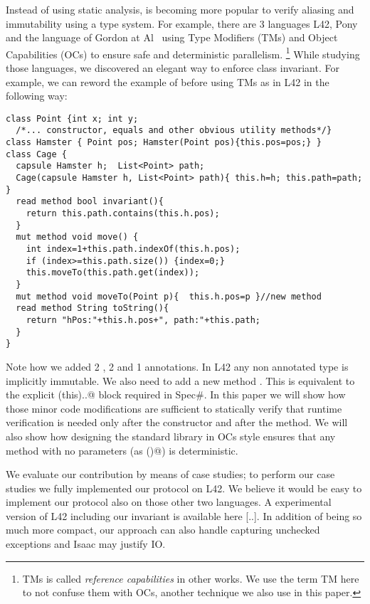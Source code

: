Instead of using static analysis, 
is becoming more popular to verify aliasing and immutability using a type system.
For example, there are 3 languages L42, Pony and the language of Gordon at Al~\cite{}
using Type Modifiers (TMs) and Object Capabilities (OCs) to ensure safe and deterministic parallelism.%
\footnote{TMs is called \emph{reference capabilities} in other works. We use the term TM here
to not confuse them with OCs, another technique we also use in this paper.}
While studying those languages, we discovered an elegant way to enforce class invariant.
For example, we can reword the example of before using TMs as in L42 in the following way:
\begin{lstlisting}
class Point {int x; int y;
  /*... constructor, equals and other obvious utility methods*/}
class Hamster { Point pos; Hamster(Point pos){this.pos=pos;} }
class Cage {
  capsule Hamster h;  List<Point> path;
  Cage(capsule Hamster h, List<Point> path){ this.h=h; this.path=path; }
  read method bool invariant(){
    return this.path.contains(this.h.pos);
  }
  mut method void move() {
    int index=1+this.path.indexOf(this.h.pos);
    if (index>=this.path.size()) {index=0;}
    this.moveTo(this.path.get(index));
  }
  mut method void moveTo(Point p){  this.h.pos=p }//new method
  read method String toString(){
    return "hPos:"+this.h.pos+", path:"+this.path;
  }
}
\end{lstlisting}
Note how we added 2 \Q@read@, 2 \Q@mut@ and 1 \Q@capsule@ annotations.
In L42 any non annotated type is implicitly immutable.
We also need to add a new method \Q@moveTo@. This is equivalent to the explicit \Q@expose(this){..}@
block required in Spec\#.
In this paper we will show how those minor code modifications are sufficient
to statically verify that runtime verification is needed only
after the constructor and after the \Q@moveTo@ method.
We will also show how designing the standard library in OCs style
ensures that any \Q@read@ method with no parameters (as \Q@invariant()@) is
deterministic.

We evaluate our contribution by means of case studies;
to perform our case studies we fully implemented our protocol on L42.
We believe it would be easy to implement our protocol also on those other two languages.
A experimental version of L42 including our invariant is available here [..].
In addition of being so much more compact, our approach can also handle capturing unchecked exceptions
and Isaac may justify IO.


